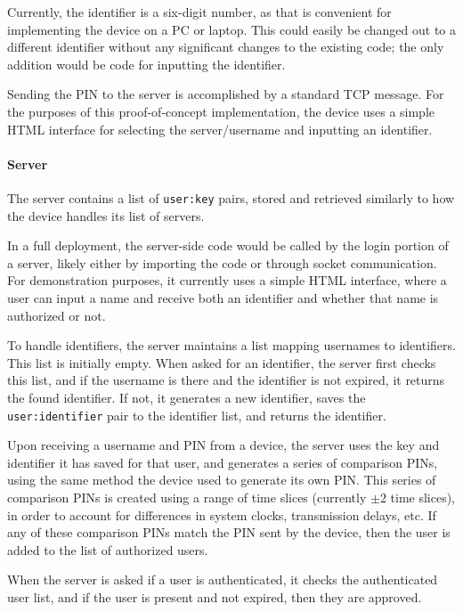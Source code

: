 \documentclass[11pt]{article}
\begin{document}
Currently, the identifier is a six-digit number, as that is convenient
for implementing the device on a PC or laptop. This could easily be
changed out to a different identifier without any significant changes to
the existing code; the only addition would be code for inputting the
identifier.

Sending the PIN to the server is accomplished by a standard TCP message.
For the purposes of this proof-of-concept implementation, the device
uses a simple HTML interface for selecting the server/username and
inputting an identifier.



\paragraph{Server}
The server contains a list of \texttt{user:key} pairs, stored and
retrieved similarly to how the device handles its list of servers.

In a full deployment, the server-side code would be called by the login
portion of a server, likely either by importing the code or through
socket communication. For demonstration purposes, it currently uses a
simple HTML interface, where a user can input a name and receive both an
identifier and whether that name is authorized or not.

To handle identifiers, the server maintains a list mapping usernames to
identifiers. This list is initially empty. When asked for an identifier,
the server first checks this list, and if the username is there and the
identifier is not expired, it returns the found identifier. If not, it
generates a new identifier, saves the \texttt{user:identifier} pair to
the identifier list, and returns the identifier.

Upon receiving a username and PIN from a device, the server uses the key
and identifier it has saved for that user, and generates a series of
comparison PINs, using the same method the device used to generate its
own PIN. This series of comparison PINs is created using a range of time
slices (currently $\pm2$ time slices), in order to account for
differences in system clocks, transmission delays, etc. If any of these
comparison PINs match the PIN sent by the device, then the user is added
to the list of authorized users.

When the server is asked if a user is authenticated, it checks the
authenticated user list, and if the user is present and not expired,
then they are approved.
\end{document}

